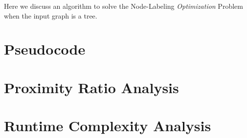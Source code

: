 \documentclass{article}
\begin{document}
Here we discuss an algorithm to solve the Node-Labeling \textit{Optimization} Problem when the input graph is a tree.


\section{Pseudocode}

\begin{algorithm}[H]
\caption{}
\KwIn{}
\KwOut{}
\BlankLine

\end{algorithm}

\section{Proximity Ratio Analysis}



\section{Runtime Complexity Analysis}
\end{document}
